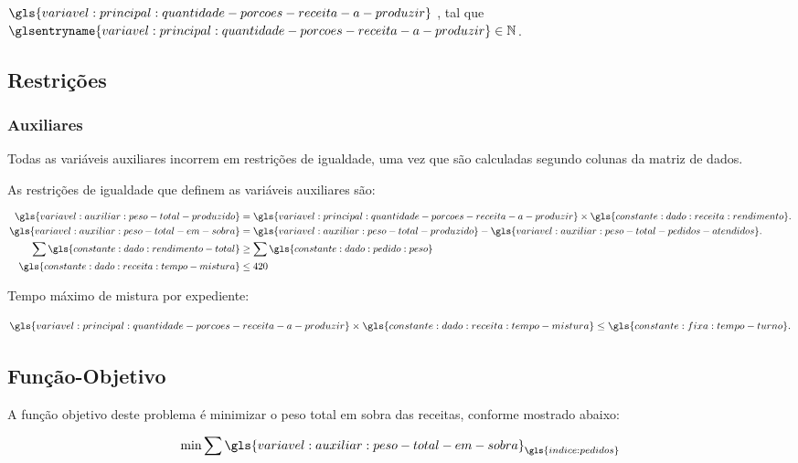 
\begin{symbols}
    \item[\( \gls{variavel:principal:quantidade-porcoes-receita-a-produzir} \)]
    ,
    tal que \( \glsentryname{variavel:principal:quantidade-porcoes-receita-a-produzir} \in \mathbb{N} \).
\end{symbols}

\subsection{Restrições}

\subsubsection{Auxiliares}

Todas as variáveis auxiliares incorrem em restrições de igualdade, uma vez que são calculadas segundo colunas da matriz de dados.

As restrições de igualdade que definem as variáveis auxiliares são:

\begin{align}
    \gls{variavel:auxiliar:peso-total-produzido} &
    = \gls{variavel:principal:quantidade-porcoes-receita-a-produzir} \times \gls{constante:dado:receita:rendimento}.
    \\
    \gls{variavel:auxiliar:peso-total-em-sobra}  &
    = \gls{variavel:auxiliar:peso-total-produzido} - \gls{variavel:auxiliar:peso-total-pedidos-atendidos}.
    \\
    \sum \gls{constante:dado:rendimento-total}   &
    \geq
    \sum \gls{constante:dado:pedido:peso}
    \\
    \gls{constante:dado:receita:tempo-mistura}   &
    \leq 420
\end{align}

Tempo máximo de mistura por expediente:

\begin{align}
    \gls{variavel:principal:quantidade-porcoes-receita-a-produzir}
    \times \gls{constante:dado:receita:tempo-mistura}
    \leq \gls{constante:fixa:tempo-turno}.
\end{align}

\subsection{Função-Objetivo}

A função objetivo deste problema é minimizar o peso total em sobra das receitas, conforme mostrado abaixo:

\begin{align}
    \min \sum \gls{variavel:auxiliar:peso-total-em-sobra}_{\gls{indice:pedidos}}
\end{align}
